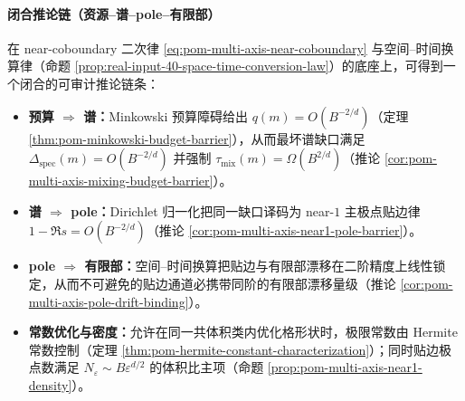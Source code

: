 \paragraph{闭合推论链（资源--谱--pole--有限部）}
在 near-coboundary 二次律 \eqref{eq:pom-multi-axis-near-coboundary} 与空间--时间换算律（命题 \ref{prop:real-input-40-space-time-conversion-law}）的底座上，可得到一个闭合的可审计推论链条：
\begin{itemize}
  \item \textbf{预算 \(\Rightarrow\) 谱：}Minkowski 预算障碍给出 \(q(m)=O(B^{-2/d})\)（定理 \ref{thm:pom-minkowski-budget-barrier}），从而最坏谱缺口满足 \(\Delta_{\mathrm{spec}}(m)=O(B^{-2/d})\) 并强制 \(\tau_{\mathrm{mix}}(m)=\Omega(B^{2/d})\)（推论 \ref{cor:pom-multi-axis-mixing-budget-barrier}）。
  \item \textbf{谱 \(\Rightarrow\) pole：}Dirichlet 归一化把同一缺口译码为 near-\(1\) 主极点贴边律 \(1-\Re s=O(B^{-2/d})\)（推论 \ref{cor:pom-multi-axis-near1-pole-barrier}）。
  \item \textbf{pole \(\Rightarrow\) 有限部：}空间--时间换算把贴边与有限部漂移在二阶精度上线性锁定，从而不可避免的贴边通道必携带同阶的有限部漂移量级（推论 \ref{cor:pom-multi-axis-pole-drift-binding}）。
  \item \textbf{常数优化与密度：}允许在同一共体积类内优化格形状时，极限常数由 Hermite 常数控制（定理 \ref{thm:pom-hermite-constant-characterization}）；同时贴边极点数满足 \(N_\varepsilon\sim B\varepsilon^{d/2}\) 的体积比主项（命题 \ref{prop:pom-multi-axis-near1-density}）。
\end{itemize}


